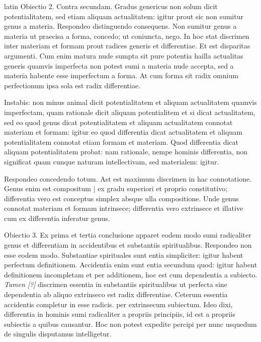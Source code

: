 \begin{otherlanguage*}{latin}
\pstart
Obiectio 2. Contra secundam. Gradus genericus non solum dicit potentialitatem, sed etiam aliquam actualitatem:
igitur prout sic non sumitur genus a materia. Respondeo distinguendo consequens. Non sumitur genus a materia ut praecisa a forma, concedo; ut coniuncta, nego. In hoc stat discrimen inter materiam et formam prout radices generis et differentiae. Et est disparitas argumenti. Cum enim matura nude sumpta sit pure potentia hailla actualitas generis quamvis imperfecta non potest sumi a materia nude accepta, sed a materia habente esse imperfectum a forma. At cum forma sit radix omnium perfectionum ipsa sola est radix differentiae. 
\pend

\pstart
Instabis:
non minus animal dicit potentialitatem et aliquam actualitatem quamvis imperfectam, quam rationale dicit aliquam potentialitem et si dicat actualitatem, sed eo quod genus dicat potentialitatem et aliquam actualitatem connotat materiam et formam:
igitur eo quod differentia dicat actualitatem et aliquam potentialitatem connotat etiam formam et materiam. Quod differentia dicat aliquam potentialitatem probat:
nam rationale, nempe hominis differentia, non significat quam cunque naturam intellectivam, sed materialem:
igitur. 
\pend

\pstart
Respondeo concedendo totum. Ast est maximum discrimen in hac connotatione. Genus enim est compositum \textnormal{|} ex gradu superiori et proprio constitutivo; differentia vero est conceptus simplex absque ulla compositione. Unde genus connotat materiam et formam intrinsece; differentia vero extrinsece et illative cum ex differentia inferatur genus. 
\pend

\pstart
Obiectio 3. Ex prima et tertia conclusione apparet eodem modo sumi radicaliter genus et differentiam in accidentibus et substantiis spiritualibus. Respondeo non esse eodem modo. Substantiae spirituales sunt entia simpliciter:
igitur habent perfectum definitionem. Accidentia enim sunt entia secundum quod:
igitur habent definitionem incompletam et per additionem, hoc est cum dependentia a subiecto. \emph{Tamen [?]} discrimen essentia in substantiis spiritualibus ut perfecta sine dependentia ab aliquo extrinseco est radix differentiae. Ceterum essentia accidentis completur in esse radicis. per extrinsecum subiectum. Ideo dixi, differentia in hominis sumi radicaliter a propriis principiis, id est a propriis subiectis a quibus causantur. Hoc non potest expedite percipi per nunc usquedum de singulis disputamus intelligetur. 
\pend


\end{otherlanguage*}
